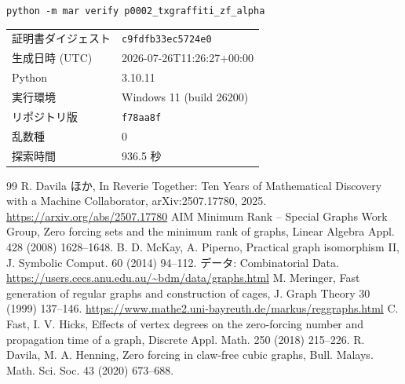 \documentclass[paper=a4,fontsize=10.5pt,jafontsize=10.5pt]{jlreq}
\theoremstyle{plain}
\theoremstyle{definition}
\begin{document}
\begin{center}\texttt{python -m mar verify p0002\_txgraffiti\_zf\_alpha}\end{center}

\begin{center}\begin{tabular}{ll}\toprule
証明書ダイジェスト & \texttt{c9fdfb33ec5724e0} \\
生成日時 (UTC) & 2026-07-26T11:26:27+00:00 \\
Python & 3.10.11 \\
実行環境 & Windows 11 (build 26200) \\
リポジトリ版 & \texttt{f78aa8f} \\
乱数種 & 0 \\
探索時間 & 936.5 秒 \\
\bottomrule\end{tabular}\end{center}


\begin{thebibliography}{99}
 R. Davila ほか, In Reverie Together: Ten Years of Mathematical Discovery with a Machine Collaborator, arXiv:2507.17780, 2025. \url{https://arxiv.org/abs/2507.17780}
 AIM Minimum Rank -- Special Graphs Work Group, Zero forcing sets and the minimum rank of graphs, Linear Algebra Appl. 428 (2008) 1628--1648.
 B. D. McKay, A. Piperno, Practical graph isomorphism II, J. Symbolic Comput. 60 (2014) 94--112. データ: Combinatorial Data. \url{https://users.cecs.anu.edu.au/~bdm/data/graphs.html}
 M. Meringer, Fast generation of regular graphs and construction of cages, J. Graph Theory 30 (1999) 137--146. \url{https://www.mathe2.uni-bayreuth.de/markus/reggraphs.html}
 C. Fast, I. V. Hicks, Effects of vertex degrees on the zero-forcing number and propagation time of a graph, Discrete Appl. Math. 250 (2018) 215--226.
 R. Davila, M. A. Henning, Zero forcing in claw-free cubic graphs, Bull. Malays. Math. Sci. Soc. 43 (2020) 673--688.
\end{thebibliography}
\end{document}
